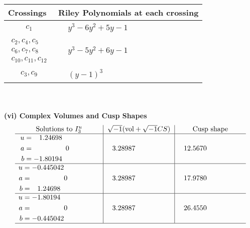 \documentclass[1p]{elsarticle_modified}
\theoremstyle{definition}
\newcommand{\I}{\sqrt{-1}}
\begin{document}
\begin{tabular}{m{50pt}|m{274pt}}
Crossings & \hspace{64pt}Riley Polynomials at each crossing \\
\hline $$\begin{aligned}c_{1}\end{aligned}$$&$\begin{aligned}
&y^3-6 y^2+5 y-1
\end{aligned}$\\
\hline $$\begin{aligned}c_{2},c_{4},c_{5}\\c_{6},c_{7},c_{8}\\c_{10},c_{11},c_{12}\end{aligned}$$&$\begin{aligned}
&y^3-5 y^2+6 y-1
\end{aligned}$\\
\hline $$\begin{aligned}c_{3},c_{9}\end{aligned}$$&$\begin{aligned}
&(y-1)^3
\end{aligned}$\\
\hline
\end{tabular}\\~\\
\newpage\flushleft \textbf{(vi) Complex Volumes and Cusp Shapes}
$$\begin{array}{c|c|c}  
\text{Solutions to }I^u_{3}& \I (\text{vol} + \sqrt{-1}CS) & \text{Cusp shape}\\
 \hline 
\begin{aligned}
u &= \phantom{-}1.24698\phantom{ +0.000000I} \\
a &= \phantom{-0.000000 } 0 \\
b &= -1.80194\phantom{ +0.000000I}\end{aligned}
 & \phantom{-}3.28987\phantom{ +0.000000I} & \phantom{-}12.5670\phantom{ +0.000000I} \\ \hline\begin{aligned}
u &= -0.445042\phantom{ +0.000000I} \\
a &= \phantom{-0.000000 } 0 \\
b &= \phantom{-}1.24698\phantom{ +0.000000I}\end{aligned}
 & \phantom{-}3.28987\phantom{ +0.000000I} & \phantom{-}17.9780\phantom{ +0.000000I} \\ \hline\begin{aligned}
u &= -1.80194\phantom{ +0.000000I} \\
a &= \phantom{-0.000000 } 0 \\
b &= -0.445042\phantom{ +0.000000I}\end{aligned}
 & \phantom{-}3.28987\phantom{ +0.000000I} & \phantom{-}26.4550\phantom{ +0.000000I}\\
 \hline 
 \end{array}$$\newpage\newpage\renewcommand{\arraystretch}{1}
\end{document}
